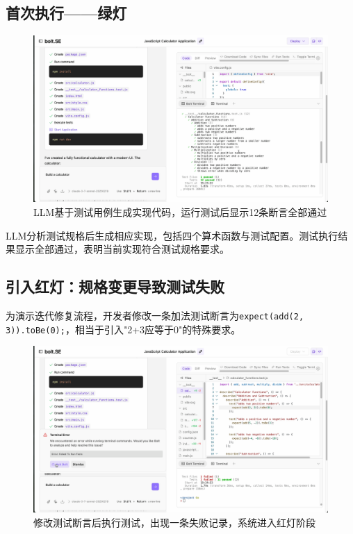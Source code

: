\subsection{首次执行——绿灯}

\begin{figure}[htbp]
  \centering
  \includegraphics[width=.9\textwidth]{figures/screenshots/tdd/green_pass_initial.png}
  \caption{LLM基于测试用例生成实现代码，运行测试后显示12条断言全部通过}
  \label{fig:tdd_green_initial}
\end{figure}

LLM分析测试规格后生成相应实现，包括四个算术函数与测试配置。测试执行结果显示全部通过，表明当前实现符合测试规格要求。

\subsection{引入红灯：规格变更导致测试失败}

为演示迭代修复流程，开发者修改一条加法测试断言为\verb|expect(add(2, 3)).toBe(0);|，相当于引入"2+3应等于0"的特殊要求。

\begin{figure}[htbp]
  \centering
  \includegraphics[width=.9\textwidth]{figures/screenshots/tdd/test_edit_fail.png}
  \caption{修改测试断言后执行测试，出现一条失败记录，系统进入红灯阶段}
  \label{fig:tdd_red}
\end{figure}

